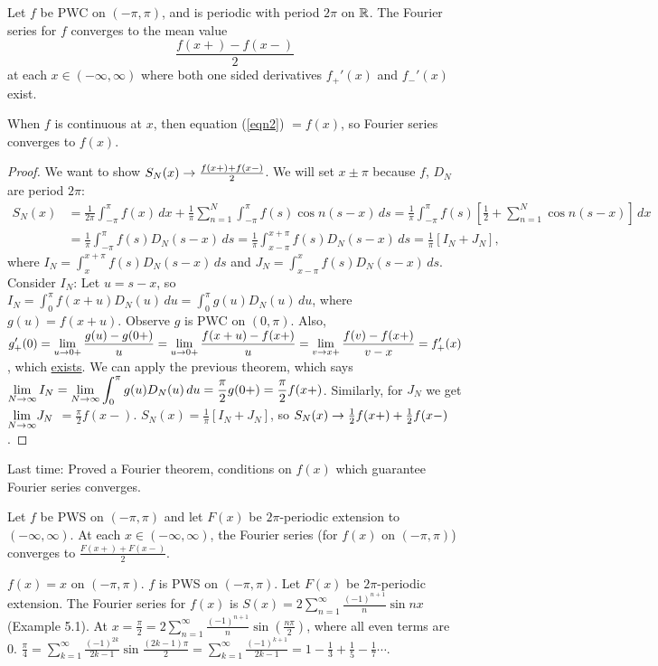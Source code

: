 \documentclass[]{article}
\begin{document}
\begin{theorem}
	Let $f$ be PWC on $(-\pi,\pi)$, and is periodic with period $2\pi$ on $\mathbb{R}$. The Fourier series for $f$ converges to the mean value \begin{equation}\frac{f(x+)-f(x-)}{2}\label{eqn2}\end{equation} at each $x\in(-\infty,\infty)$ where both one sided derivatives $f_+'(x)$ and $f_-'(x)$ exist.
\end{theorem}
\begin{note}
	When $f$ is continuous at $x$, then equation (\ref{eqn2}) $= f(x)$, so Fourier series converges to $f(x)$.
\end{note}
\begin{proof}
	We want to show $S_N(x) \rightarrow \frac{f(x+) + f(x-)}{2}$. We will set $x\pm\pi $ because $f$, $D_N$ are period $2\pi$: \begin{align*} S_N(x) &= \frac{1}{2\pi} \int_{-\pi}^\pi f(x) \, dx + \frac{1}{\pi} \sum_{n=1}^N \int_{-\pi}^\pi f(s) \cos{n(s-x)}\, ds = \frac{1}{\pi} \int_{-\pi}^\pi f(s) \left[ \frac{1}{2} + \sum_{n=1}^N \cos{n(s-x)} \right] \, dx \\ &= \frac{1}{\pi}\int_{-\pi}^\pi f(s) D_N(s-x) \, ds = \frac{1}{\pi} \int_{x-\pi}^{x+\pi} f(s) D_N(s-x) \, ds = \frac{1}{\pi} [I_N + J_N ], \end{align*} where $I_N = \int_x^{x+\pi} f(s) D_N(s-x)\, ds$ and $J_N = \int_{x-\pi}^x f(s) D_N(s-x) \, ds$. Consider $I_N$: Let $u=s-x$, so $\displaystyle I_N = \int_0^\pi f(x+u) D_N(u)\, du = \int_0^\pi g(u) D_N(u)\, du$, where $g(u) = f(x+u)$. 
	Observe $g$ is PWC on $(0,\pi)$. Also, $\displaystyle g_+'(0) = \lim_{u\rightarrow0+} \frac{g(u)-g(0+)}{u} = \lim_{u\rightarrow0+} \frac{f(x+u)-f(x+)}{u} = \lim_{v\rightarrow x+} \frac{f(v) - f(x+)}{v-x} = f_+'(x)$, which \underline{exists}. We can apply the previous theorem, which says $\displaystyle \lim_{N\rightarrow\infty} I_N = \lim_{N\rightarrow\infty} \int_0^\pi g(u) D_N(u) \, du = \frac{\pi}{2} g(0+) = \frac{\pi}{2} f(x+)$. Similarly, for $J_N$ we get $\displaystyle{\lim_{N\rightarrow\infty}} J_N $ $= \frac{\pi}{2} f(x-)$. $S_N(x) = \frac{1}{\pi} [I_N + J_N]$, so $S_N(x) \rightarrow \frac{1}{2} f(x+) + \frac{1}{2} f(x-)$.
\end{proof}

Last time: Proved a Fourier theorem, conditions on $f(x)$ which guarantee Fourier series converges.
\begin{corollary}
	Let $f$ be PWS on $(-\pi,\pi)$ and let $F(x)$ be $2\pi$-periodic extension to $(-\infty,\infty)$. At each $x\in(-\infty,\infty)$, the Fourier series (for $f(x)$ on $(-\pi,\pi)$) converges to $\frac{F(x+)+F(x-)}{2}$.
\end{corollary}
\begin{example}
	$f(x)=x$ on $(-\pi,\pi)$. $f$ is PWS on $(-\pi,\pi)$. Let $F(x)$ be $2\pi$-periodic extension.
	The Fourier series for $f(x)$ is $S(x) = 2\sum_{n=1}^\infty \frac{(-1)^{n+1}}{n}\sin{nx}$ (Example 5.1).
	At $x = \frac{\pi}{2} = 2\sum_{n=1}^{\infty} \frac{(-1)^{n+1}}{n}\sin{\left(\frac{n\pi}{2}\right)}$, where all even terms are 0. $\frac{\pi}{4} = \sum_{k=1}^\infty \frac{(-1)^{2k}}{2k-1} \sin{\frac{(2k-1)\pi}{2}} = \sum_{k=1}^\infty \frac{(-1)^{k+1}}{2k-1} = 1-\frac{1}{3} + \frac{1}{5} - \frac{1}{7}\cdots$.
\end{example}
\end{document}

